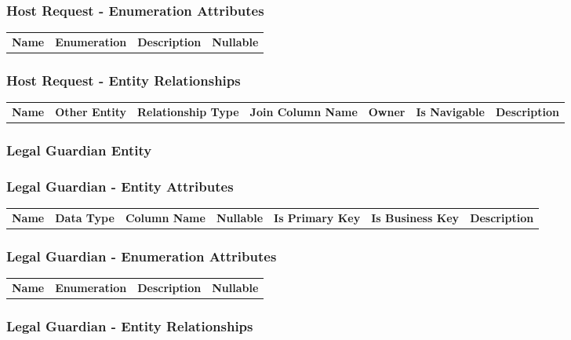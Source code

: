 \subsubsection*{ Host Request - Enumeration Attributes}

\begin{tabular}{lcp{6.0cm}c}
\bfseries Name & \bfseries Enumeration & \bfseries Description & \bfseries Nullable \\
\end{tabular}

\subsubsection*{ Host Request - Entity Relationships}

\begin{tabular}{llllllp{2.0cm}}
\bfseries Name & \bfseries Other Entity & \bfseries Relationship Type & \bfseries Join Column Name & \bfseries Owner & \bfseries Is Navigable & \bfseries Description\\
\end{tabular}


\subsubsection{ Legal Guardian Entity }

\subsubsection*{ Legal Guardian - Entity Attributes }

\begin{tabular}{lllcccl}
\bfseries Name & \bfseries Data Type & \bfseries Column Name & \bfseries Nullable & \bfseries Is Primary Key & \bfseries Is Business Key & \bfseries Description\\
\end{tabular}

\subsubsection*{ Legal Guardian - Enumeration Attributes}

\begin{tabular}{lcp{6.0cm}c}
\bfseries Name & \bfseries Enumeration & \bfseries Description & \bfseries Nullable \\
\end{tabular}

\subsubsection*{ Legal Guardian - Entity Relationships}


